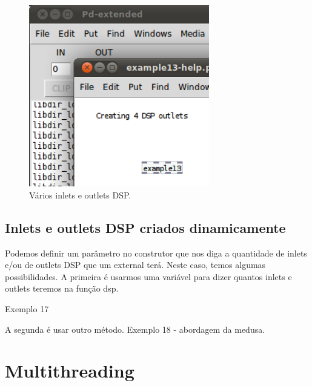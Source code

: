 \documentclass[10pt,a4paper]{report}
\begin{document}
\begin{figure}[h!]
	\centering
	\includegraphics[width=0.7\textwidth]{example13}
	\caption{Vários inlets e outlets DSP.}
\end{figure}

\section{Inlets e outlets DSP criados dinamicamente}

Podemos definir um parâmetro no construtor que nos diga a quantidade de inlets e/ou de outlets DSP que um external terá. Neste caso, temos algumas possibilidades. A primeira é usarmos uma variável para dizer quantos inlets e outlets teremos na função dsp.

Exemplo 17

A segunda é usar outro método. Exemplo 18 - abordagem da medusa.


\chapter{Multithreading}

\end{document}
